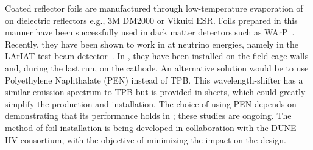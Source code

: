 Coated reflector foils are manufactured through low-temperature evaporation of  on dielectric reflectors e.g., 3M DM2000 or Vikuiti ESR. Foils prepared in this manner have been successfully used in dark matter detectors such as WArP~\cite{Acciarri:2008kv}. Recently, they have been shown to work in  at neutrino energies, namely  in the LArIAT test-beam detector~\cite{Garcia-Gamez:2017cmu}. In , they have been installed on the field cage walls and, during the last run, on the cathode. An alternative solution would be to use Polyethylene Naphthalate (PEN) instead of TPB. This wavelength-shifter has a similar emission spectrum to TPB \cite{Kuzniak:2018dcf} but is provided in sheets, which could greatly simplify the production and installation. The choice of using PEN depends on demonstrating that its performance holds in \lar; these studies are ongoing. 
The method of foil installation is being developed in collaboration with the DUNE HV consortium, with the objective of minimizing the impact on the  design. 



